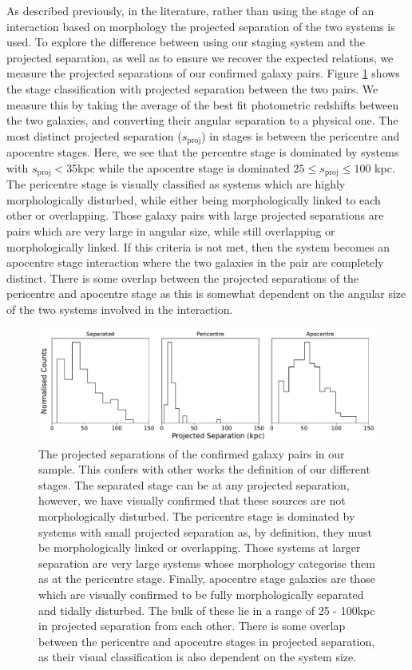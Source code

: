As described previously, in the literature, rather than using the stage of an interaction based on morphology the projected separation of the two systems is used. To explore the difference between using our staging system and the projected separation, as well as to ensure we recover the expected relations, we measure the projected separations of our confirmed galaxy pairs. Figure \ref{fig:proj-seps} shows the stage classification with projected separation between the two pairs. We measure this by taking the average of the best fit photometric redshifts between the two galaxies, and converting their angular separation to a physical one. The most distinct projected separation ($s_{\mathrm{proj}}$) in stages is between the pericentre and apocentre stages. Here, we see that the percentre stage is dominated by systems with $s_{\mathrm{proj}}<$35kpc while the apocentre stage is dominated $25 \leq s_{\mathrm{proj}} \leq 100$ kpc. The pericentre stage is visually classified as systems which are highly morphologically disturbed, while either being morphologically linked to each other or overlapping. Those galaxy pairs with large projected separations are pairs which are very large in angular size, while still overlapping or morphologically linked. If this criteria is not met, then the system becomes an apocentre stage interaction where the two galaxies in the pair are completely distinct. There is some overlap between the projected separations of the pericentre and apocentre stage as this is somewhat dependent on the angular size of the two systems involved in the interaction.

\begin{figure}
\centering
\includegraphics[width=\textwidth]{Chapter3/figures/projected-seps.pdf}
\caption[The projected separations of the confirmed galaxy pairs in our sample.]{The projected separations of the confirmed galaxy pairs in our sample. This confers with other works the definition of our different stages. The separated stage can be at any projected separation, however, we have visually confirmed that these sources are not morphologically disturbed. The pericentre stage is dominated by systems with small projected separation as, by definition, they must be morphologically linked or overlapping. Those systems at larger separation are very large systems whose morphology categorise them as at the pericentre stage. Finally, apocentre stage galaxies are those which are visually confirmed to be fully morphologically separated and tidally disturbed. The bulk of these lie in a range of 25 - 100kpc in projected separation from each other. There is some overlap between the pericentre and apocentre stages in projected separation, as their visual classification is also dependent on the system size.}
\label{fig:proj-seps}
\end{figure}

